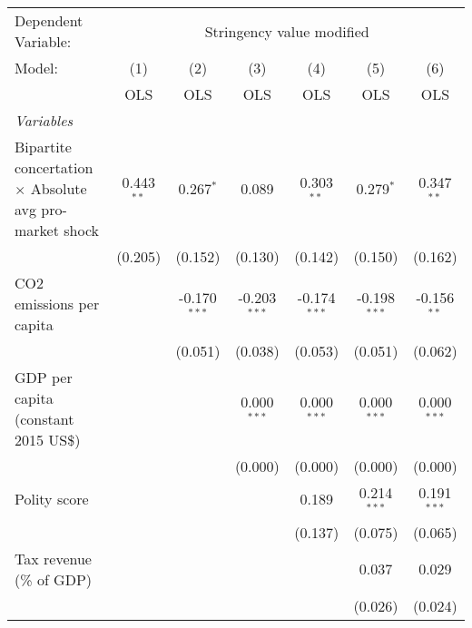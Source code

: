 
\begingroup
\centering
\begin{tabular}{lcccccc}
   \toprule
   Dependent Variable: & \multicolumn{6}{c}{Stringency value modified}\\
   Model:                                                         & (1)          & (2)            & (3)            & (4)            & (5)            & (6)\\  
                                                                  &  OLS         & OLS            & OLS            & OLS            & OLS            & OLS\\  
   \midrule
   \emph{Variables}\\
   Bipartite concertation $\times$ Absolute avg pro-market shock  & 0.443$^{**}$ & 0.267$^{*}$    & 0.089          & 0.303$^{**}$   & 0.279$^{*}$    & 0.347$^{**}$\\   
                                                                  & (0.205)      & (0.152)        & (0.130)        & (0.142)        & (0.150)        & (0.162)\\   
   CO2 emissions per capita                                       &              & -0.170$^{***}$ & -0.203$^{***}$ & -0.174$^{***}$ & -0.198$^{***}$ & -0.156$^{**}$\\   
                                                                  &              & (0.051)        & (0.038)        & (0.053)        & (0.051)        & (0.062)\\   
   GDP per capita (constant 2015 US\$)                            &              &                & 0.000$^{***}$  & 0.000$^{***}$  & 0.000$^{***}$  & 0.000$^{***}$\\   
                                                                  &              &                & (0.000)        & (0.000)        & (0.000)        & (0.000)\\   
   Polity score                                                   &              &                &                & 0.189          & 0.214$^{***}$  & 0.191$^{***}$\\   
                                                                  &              &                &                & (0.137)        & (0.075)        & (0.065)\\   
   Tax revenue (\% of GDP)                                        &              &                &                &                & 0.037          & 0.029\\   
                                                                  &              &                &                &                & (0.026)        & (0.024)\\   

\end{tabular}
